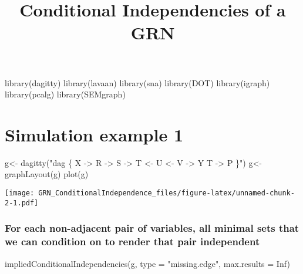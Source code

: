 \documentclass[
]{article}
\title{Conditional Independencies of a GRN}
\author{}
\date{\vspace{-2.5em}}
\newenvironment{Shaded}{\begin{snugshade}}{\end{snugshade}}
\newcommand{\AttributeTok}[1]{\textcolor[rgb]{0.77,0.63,0.00}{#1}}
\newcommand{\ConstantTok}[1]{\textcolor[rgb]{0.00,0.00,0.00}{#1}}
\newcommand{\FunctionTok}[1]{\textcolor[rgb]{0.00,0.00,0.00}{#1}}
\newcommand{\NormalTok}[1]{#1}
\newcommand{\OtherTok}[1]{\textcolor[rgb]{0.56,0.35,0.01}{#1}}
\newcommand{\StringTok}[1]{\textcolor[rgb]{0.31,0.60,0.02}{#1}}
\begin{document}
\maketitle

\begin{Shaded}
\begin{Highlighting}[]
\FunctionTok{library}\NormalTok{(dagitty)}
\FunctionTok{library}\NormalTok{(lavaan)}
\FunctionTok{library}\NormalTok{(sna)}
\FunctionTok{library}\NormalTok{(DOT)}
\FunctionTok{library}\NormalTok{(igraph)}
\FunctionTok{library}\NormalTok{(pcalg)}
\FunctionTok{library}\NormalTok{(SEMgraph)}
\end{Highlighting}
\end{Shaded}

\hypertarget{simulation-example-1}{%
\section{Simulation example 1}\label{simulation-example-1}}

\begin{Shaded}
\begin{Highlighting}[]
\NormalTok{g}\OtherTok{\textless{}{-}} \FunctionTok{dagitty}\NormalTok{(}\StringTok{"dag \{}
\StringTok{    X {-}\textgreater{} R {-}\textgreater{} S {-}\textgreater{} T \textless{}{-} U \textless{}{-} V {-}\textgreater{} Y}
\StringTok{    T {-}\textgreater{} P}
\StringTok{\}"}\NormalTok{)}
\NormalTok{g}\OtherTok{\textless{}{-}}\FunctionTok{graphLayout}\NormalTok{(g)}
\FunctionTok{plot}\NormalTok{(g)}
\end{Highlighting}
\end{Shaded}

\texttt{[image: GRN\_ConditionalIndependence\_files/figure-latex/unnamed-chunk-2-1.pdf]}

\hypertarget{for-each-non-adjacent-pair-of-variables-all-minimal-sets-that-we-can-condition-on-to-render-that-pair-independent}{%
\subsubsection{For each non-adjacent pair of variables, all minimal sets
that we can condition on to render that pair
independent}\label{for-each-non-adjacent-pair-of-variables-all-minimal-sets-that-we-can-condition-on-to-render-that-pair-independent}}

\begin{Shaded}
\begin{Highlighting}[]
\FunctionTok{impliedConditionalIndependencies}\NormalTok{(g, }\AttributeTok{type =} \StringTok{"missing.edge"}\NormalTok{, }\AttributeTok{max.results =} \ConstantTok{Inf}\NormalTok{)}
\end{Highlighting}
\end{Shaded}
\end{document}
